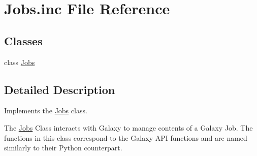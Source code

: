 \hypertarget{Jobs_8inc}{}\section{Jobs.\+inc File Reference}
\label{Jobs_8inc}
\subsection*{Classes}
\begin{DoxyCompactItemize}
\item 
class \hyperlink{classJobs}{Jobs}
\end{DoxyCompactItemize}


\subsection{Detailed Description}
Implements the \hyperlink{classJobs}{Jobs} class.

The \hyperlink{classJobs}{Jobs} Class interacts with Galaxy to manage contents of a Galaxy Job. The functions in this class correspond to the Galaxy A\+PI functions and are named similarly to their Python counterpart. 